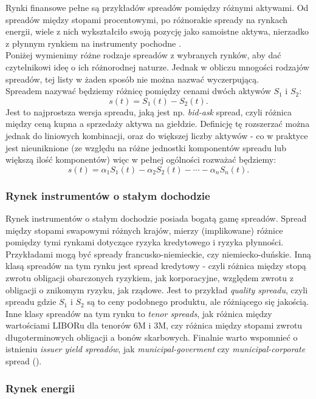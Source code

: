 Rynki finansowe pełne są przykładów spreadów pomiędzy różnymi aktywami. Od spreadów między stopami procentowymi, po różnorakie spready na rynkach energii, wiele z nich wykształciło swoją pozycję jako samoistne aktywa, nierzadko z płynnym rynkiem na instrumenty pochodne \cite{Carmona_Spread_Options}.\\
Poniżej wymienimy różne rodzaje spreadów z wybranych rynków, aby dać czytelnikowi ideę o ich różnorodnej naturze. Jednak w obliczu mnogości rodzajów spreadów, tej listy w żaden sposób nie można nazwać wyczerpującą.\\

Spreadem nazywać będziemy różnicę pomiędzy cenami dwóch aktywów $S_1$ i $S_2$:
$$ s(t) = S_1(t) - S_2(t).$$
Jest to najprostsza wersja spreadu, jaką jest np. \emph{bid-ask} spread, czyli różnica między ceną kupna a sprzedaży aktywa na giełdzie. Definicję tę rozszerzać można jednak do liniowych kombinacji, oraz do większej liczby aktywów - co w praktyce jest nieuniknione (ze względu na różne jednostki komponentów spreadu lub większą ilość komponentów) więc w pełnej ogólności rozważać będziemy:
$$ s(t) = \alpha_1S_1(t) - \alpha_2S_2(t) - \cdots -\alpha_nS_n(t).$$

\subsubsection{Rynek instrumentów o stałym dochodzie}

Rynek instrumentów o stałym dochodzie posiada bogatą gamę spreadów. Spread między stopami swapowymi różnych krajów, mierzy (implikowane) różnice pomiędzy tymi rynkami dotyczące ryzyka kredytowego i ryzyka płynności. Przykładami mogą być spready francusko-niemieckie, czy niemiecko-duńskie. Inną klasą spreadów na tym rynku jest spread kredytowy - czyli różnica między stopą zwrotu obligacji obarczonych ryzykiem, jak korporacyjne, względem zwrotu z obligacji o znikomym ryzyku, jak rządowe. Jest to przykład \emph{quality spreadu}, czyli spreadu gdzie $S_1$ i $S_2$ są to ceny podobnego produktu, ale różniącego się jakością.\\
Inne klasy spreadów na tym rynku to \emph{tenor spreads}, jak różnica między wartościami LIBORu dla tenorów 6M i 3M, czy różnica między stopami zwrotu długoterminowych obligacji a bonów skarbowych. Finalnie warto wspomnieć o istnieniu \emph{issuer yield spreadów}, jak \emph{municipal-goverment} czy \emph{municipal-corporate} spread (\cite{Fixed_Income}).


\subsubsection{Rynek energii}

